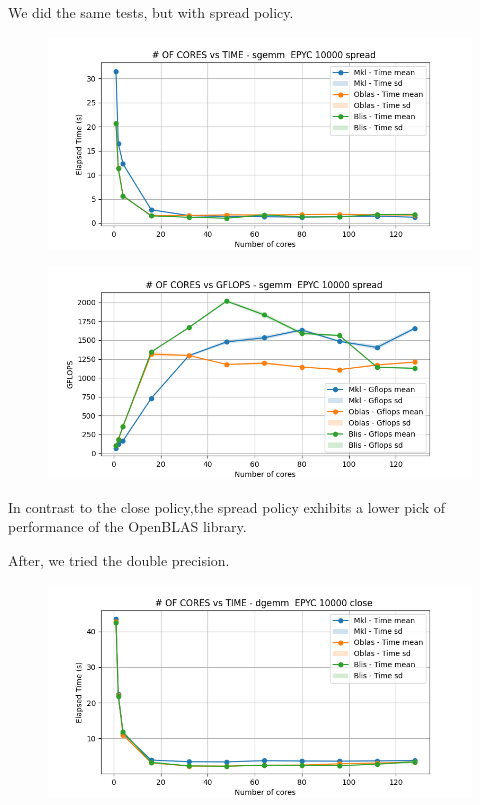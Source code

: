 \documentclass[12pt, titlepage]{report}
\begin{document}
We did the same tests, but with spread policy.
\begin{figure}[H]
    \centering
    \includegraphics[width=\textwidth]{EPYC scalability/sgemm__EPYC_10000_spread_time.png}
\end{figure}

\begin{figure}[H]
    \centering
    \includegraphics[width=\textwidth]{EPYC scalability/sgemm__EPYC_10000_spread_gflops.png}
\end{figure}
In contrast to the close policy,the spread policy exhibits a lower pick of performance of the OpenBLAS library. 

After, we tried the double precision.
\begin{figure}[H]
    \centering
    \includegraphics[width=\textwidth]{EPYC scalability/dgemm__EPYC_10000_close_time.png}
\end{figure}
\end{document}
